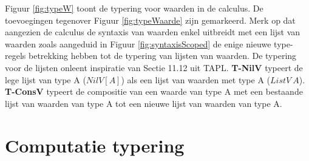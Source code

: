 Figuur \ref{fig:typeW} toont de typering voor waarden in de calculus. De toevoegingen tegenover Figuur \ref{fig:typeWaarde} zijn gemarkeerd. Merk op dat aangezien de calculus de syntaxis van waarden enkel uitbreidt met een lijst van waarden zoals aangeduid in Figuur \ref{fig:syntaxisScoped} de enige nieuwe type-regels betrekking hebben tot de typering van lijsten van waarden. De typering voor de lijsten onleent inspiratie van Sectie 11.12 uit TAPL\cite{Pierce2002}. \newline
\textbf{T-NilV} typeert de lege lijst van type A ($NilV[A]$) als een lijst van waarden met type A ($ListV \  A$). \newline
\textbf{T-ConsV} typeert de compositie van een waarde van type A met een bestaande lijst van waarden van type A tot een nieuwe lijst van waarden van type A.

\section{Computatie typering}

